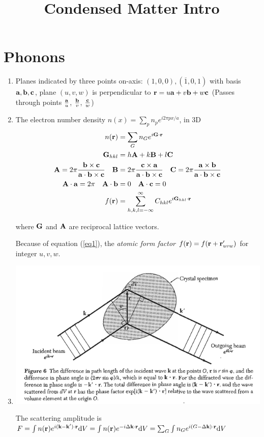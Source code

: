 \documentclass{article}
\theoremstyle{remark}
\theoremstyle{remark}
\newcommand{\where}[1]{\begin{flushright}where #1.\end{flushright}}
\begin{document}
\title{Condensed Matter Intro}
\maketitle

\section*{Phonons}
\begin{enumerate}
    \item Planes indicated by three points on-axis: $(1,0,0), (\overline{1},0,1)$ with basis $\vb{a},\vb{b},\vb{c}$, plane $(u,v,w)$ is perpendicular to $\vb{r}=u\vb{a}+v\vb{b}+w\vb{c}$ (Passes through points $\frac{\vb{a}}{u}$, $\frac{\vb{b}}{v}$, $\frac{\vb{c}}{w}$)
    \item The electron number density $n(x)=\sum_p n_p e^{i2\pi px/a}$, in 3D
    \begin{align}
            n(\vb{r}) &= \sum_G n_G e^{i\vb{G}\cdot\vb{r}}\\
            \vb{G}_{hkl} &= h\vb{A}+k\vb{B}+l\vb{C}\\
            \vb{A}=2\pi\frac{\vb{b}\times\vb{c}}{\vb{a}\cdot\vb{b}\times\vb{c}}\quad \vb{B}&=2\pi\frac{\vb{c}\times\vb{a}}{\vb{a}\cdot\vb{b}\times\vb{c}} \quad \vb{C}=2\pi\frac{\vb{a}\times\vb{b}}{\vb{a}\cdot\vb{b}\times\vb{c}}\\
            \vb{A}\cdot\vb{a} = 2\pi\quad \vb{A}\cdot\vb{b}&= 0\quad \vb{A}\cdot\vb{c}=0\label{eq1}\\
            f(\vb{r}) &= \sum_{h,k,l=-\infty}^\infty C_{hkl}e^{i\vb{G}_{hkl}\cdot\vb{r}}
        \end{align}
        \where{$\vb{G}$ and $\vb{A}$ are reciprocal lattice vectors}
        Because of equation (\ref{eq1}), the \textit{atomic form factor} $f(\vb{r})=f(\vb{r}+\vb{r}_{uvw}')$ for integer $u,v,w$.
    \item \quad
    
    \begin{center}
        \includegraphics*[width=0.8\linewidth]{cmp_diffraction.png}
    \end{center}
    The scattering amplitude is $F=\int n(\vb{r})e^{i(\vb{k}-\vb{k}')\cdot\vb{r}}\dd V=\int n(\vb{r})e^{-i\Delta\vb{k}\cdot\vb{r}}\dd V = \sum_G\int n_G e^{i(G-\Delta\vb{k})\cdot\vb{r}}\dd V$


\end{enumerate}
\end{document}
